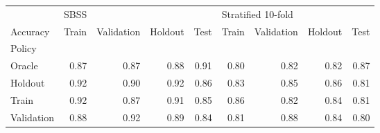 \begin{table}
\centering
\label{tab:policy_sbss_no_sbss.tex}
\begin{tabular}{lrrrrrrrr}
\toprule
{} & \multicolumn{4}{l}{SBSS} & \multicolumn{4}{l}{Stratified 10-fold} \\
Accuracy & Train & Validation & Holdout &  Test &              Train & Validation & Holdout &  Test \\
Policy     &       &            &         &       &                    &            &         &       \\
\midrule
Oracle     &  0.87 &       0.87 &    0.88 &  0.91 &               0.80 &       0.82 &    0.82 &  0.87 \\
Holdout    &  0.92 &       0.90 &    0.92 &  0.86 &               0.83 &       0.85 &    0.86 &  0.81 \\
Train      &  0.92 &       0.87 &    0.91 &  0.85 &               0.86 &       0.82 &    0.84 &  0.81 \\
Validation &  0.88 &       0.92 &    0.89 &  0.84 &               0.81 &       0.88 &    0.84 &  0.80 \\
\bottomrule
\end{tabular}
\end{table}
